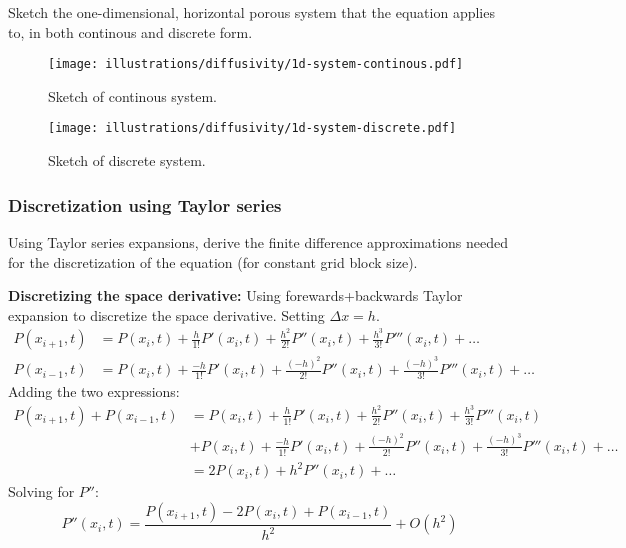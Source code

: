 \begin{question}
  Sketch the one-dimensional, horizontal porous system that the equation applies to, in both continous and discrete form.
\end{question}

\begin{figure}[H]
  \centering
  \texttt{[image: illustrations/diffusivity/1d-system-continous.pdf]}
  \caption{Sketch of continous system.}
  \label{fig:diffusivity_1d_continous}
\end{figure}

\begin{figure}[H]
  \centering
  \texttt{[image: illustrations/diffusivity/1d-system-discrete.pdf]}
  \caption{Sketch of discrete system.}
  \label{fig:diffusivity_1d_discrete}
\end{figure}


\subsubsection{Discretization using Taylor series} %
\label{ssub:discretization_using_taylor_series}

\begin{question}
  Using Taylor series expansions, derive the finite difference approximations needed for the
discretization of the equation (for constant grid block size).
\end{question}

\noindent \textbf{Discretizing the space derivative:}
Using forewards+backwards  Taylor expansion to discretize the space derivative. Setting $\Delta x = h$.
\begin{align}
  \nonumber
  P(x_{i+1},t) &= P\left(x_{i},t\right)+\frac{h}{1!}P'\left(x_{i},t\right)+\frac{h^{2}}{2!}P''\left(x_{i},t\right)+\frac{h^{3}}{3!}P'''\left(x_{i},t\right)+\dots \\
  \nonumber
  P(x_{i-1},t) &= P\left(x_{i},t\right)+\frac{-h}{1!}P'\left(x_{i},t\right)+\frac{(-h)^{2}}{2!}P''\left(x_{i},t\right)+\frac{(-h)^{3}}{3!}P'''\left(x_{i},t\right)+\dots
\end{align}
Adding the two expressions:
\begin{align}
  \nonumber
  P(x_{i+1},t) + P(x_{i-1},t)
  &= P\left(x_{i},t\right)+\frac{h}{1!}P'\left(x_{i},t\right)+\frac{h^{2}}{2!}P''\left(x_{i},t\right)+\frac{h^{3}}{3!}P'''\left(x_{i},t\right) \\
  &+P\left(x_{i},t\right)+\frac{-h}{1!}P'\left(x_{i},t\right)+\frac{(-h)^{2}}{2!}P''\left(x_{i},t\right)+\frac{(-h)^{3}}{3!}P'''\left(x_{i},t\right)+\dots \nonumber \\
  \nonumber
  &= 2P\left(x_{i},t\right)+h^{2}P''\left(x_{i},t\right)+\dots
\end{align}
Solving for $P''$:
\begin{equation}
  P''\left(x_{i},t\right)=\frac{P\left(x_{i+1},t\right)-2P\left(x_{i},t\right)+P\left(x_{i-1},t\right)}{h^{2}}+O\left(h^{2}\right)
\end{equation}


